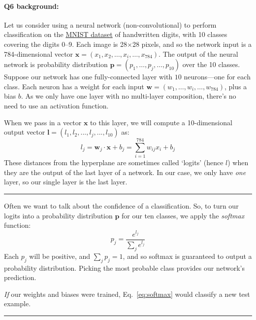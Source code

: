 \pagebreak
\paragraph{Q6 background:}
Let us consider using a neural network (non-convolutional) to perform classification on the \href{http://yann.lecun.com/exdb/mnist/}{MNIST dataset} of handwritten digits, with 10 classes covering the digits 0--9. Each image is 28$\times$28 pixels, and so the network input is a 784-dimensional vector $\mathbf{x}=(x_1,x_2,\dots,x_i,\dots,x_{784})$. The output of the neural network is probability distribution $\mathbf{p}=(p_1,\dots,p_j,\dots,p_{10})$ over the 10 classes. Suppose our network has one fully-connected layer with $10$ neurons---one for each class. Each neuron has a weight for each input $\mathbf{w}=(w_1,\dots,w_i,\dots,w_{784})$, plus a bias $b$. As we only have one layer with no multi-layer composition, there's no need to use an activation function.

When we pass in a vector $\mathbf{x}$ to this layer, we will compute a 10-dimensional output vector $\mathbf{l}=(l_1,l_2,...,l_j,...,l_{10})$ as:
\begin{equation}
    l_j = \mathbf{w}_j \cdot \mathbf{x} + b_j = \sum_{i=1}^{784}w_{ij}x_i + b_j
\end{equation}
These distances from the hyperplane are sometimes called `logits' (hence $l$) when they are the output of the last layer of a network. In our case, we only have \emph{one} layer, so our single layer is the last layer.

\hspace{\fill}\rule{0.5\linewidth}{.5pt}\hspace{\fill}

Often we want to talk about the confidence of a classification. So, to turn our logits into a probability distribution $\mathbf{p}$ for our ten classes, we apply the \emph{softmax} function:
\begin{equation}
    p_j = \frac{e^{l_j}}{\sum_je^{l_j}}
    \label{eq:softmax}
\end{equation}
Each $p_j$ will be positive, and $\sum_jp_j = 1$, and so softmax is guaranteed to output a probability distribution. Picking the most probable class provides our network's prediction.

\emph{If} our weights and biases were trained, Eq.~\ref{eq:softmax} would classify a new test example.

\hspace{\fill}\rule{0.5\linewidth}{.5pt}\hspace{\fill}

